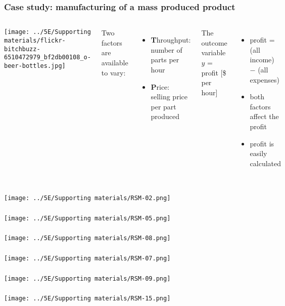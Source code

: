 \documentclass[11pt,aspectratio=169,mathserif]{beamer}
\begin{document}
\begin{frame}\frametitle{Case study: manufacturing of a mass produced product}
	\begin{columns}[c]
				\centerline{\texttt{[image: ../5E/Supporting materials/flickr-bitchbuzz-6510472979\_bf2db00108\_o-beer-bottles.jpg]}}
			Two factors are available to vary:
			\begin{itemize}
				\item	\textbf{T}hroughput: number of parts per hour
				\item	\textbf{P}rice: selling price per part produced
			\end{itemize}
			
			\vspace{1cm}
			\pause
			The outcome variable $y$ = profit [\$ per hour]
			
			\begin{itemize}
				\item	profit = (all income) $-$ (all expenses) \pause
				\item	both factors affect the profit
				\item	profit is easily calculated 
			\end{itemize}
	\end{columns}
\end{frame}
\begin{frame}\frametitle{}
	\centerline{\texttt{[image: ../5E/Supporting materials/RSM-02.png]}}
\end{frame}
\begin{frame}\frametitle{}
	\centerline{\texttt{[image: ../5E/Supporting materials/RSM-05.png]}}
\end{frame}
\begin{frame}\frametitle{}
	\centerline{\texttt{[image: ../5E/Supporting materials/RSM-08.png]}}
\end{frame}
\begin{frame}\frametitle{}
	\centerline{\texttt{[image: ../5E/Supporting materials/RSM-07.png]}}
\end{frame}
\begin{frame}\frametitle{}
	\centerline{\texttt{[image: ../5E/Supporting materials/RSM-09.png]}}
\end{frame}
\begin{frame}\frametitle{}
	\centerline{\texttt{[image: ../5E/Supporting materials/RSM-15.png]}}
\end{frame}
\end{document}
